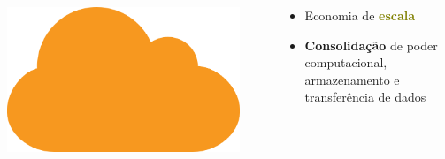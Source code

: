 \documentclass{beamer}
\newcommand{\colorize}[2]{\textbf{\textcolor{#1}{#2}}}
\begin{document}
\begin{frame}
\frametitle{}

\begin{columns}
	\begin{column}{0.5\textwidth}	
	\begin{center}
	  \includegraphics[width=0.9\textwidth]{nuvem.png}
	\end{center}
	\end{column}
	\begin{column}{0.5\textwidth}	
		\begin{itemize}
			\item Economia de \colorize{olive}{escala}
			\item \colorize{n_violet}{Consolidação} de poder computacional, armazenamento e
				transferência de dados
		\end{itemize}
	\end{column}
\end{columns}


\end{frame}
\end{document}
